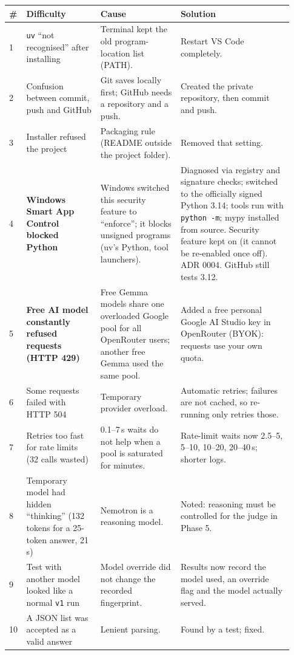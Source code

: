 \documentclass[11pt,a4paper]{article}
\newcommand{\code}[1]{\nolinkurl{#1}}
\begin{document}
\begin{longtable}{@{}p{0.03\linewidth}p{0.25\linewidth}p{0.27\linewidth}p{0.38\linewidth}@{}}
\toprule
\textbf{\#} & \textbf{Difficulty} & \textbf{Cause} & \textbf{Solution} \\
\midrule
\endhead
1 & \code{uv} ``not recognised'' after installing & Terminal kept the old program-location list (PATH). & Restart VS Code completely. \\
2 & Confusion between commit, push and GitHub & Git saves locally first; GitHub needs a repository and a push. & Created the private repository, then commit and push. \\
3 & Installer refused the project & Packaging rule (README outside the project folder). & Removed that setting. \\
4 & \textbf{Windows Smart App Control blocked Python} & Windows switched this security feature to ``enforce''; it blocks unsigned programs (uv's Python, tool launchers). & Diagnosed via registry and signature checks; switched to the officially signed Python 3.14; tools run with \texttt{python -m}; mypy installed from source. Security feature kept on (it cannot be re-enabled once off). ADR 0004. GitHub still tests 3.12. \\
5 & \textbf{Free AI model constantly refused requests (HTTP 429)} & Free Gemma models share one overloaded Google pool for all OpenRouter users; another free Gemma used the same pool. & Added a free personal Google AI Studio key in OpenRouter (BYOK): requests use your own quota. \\
6 & Some requests failed with HTTP 504 & Temporary provider overload. & Automatic retries; failures are not cached, so re-running only retries those. \\
7 & Retries too fast for rate limits (32 calls wasted) & 0.1--7\,s waits do not help when a pool is saturated for minutes. & Rate-limit waits now 2.5--5, 5--10, 10--20, 20--40\,s; shorter logs. \\
8 & Temporary model had hidden ``thinking'' (132 tokens for a 25-token answer, 21\,s) & Nemotron is a reasoning model. & Noted: reasoning must be controlled for the judge in Phase 5. \\
9 & Test with another model looked like a normal \code{v1} run & Model override did not change the recorded fingerprint. & Results now record the model used, an override flag and the model actually served. \\
10 & A JSON list was accepted as a valid answer & Lenient parsing. & Found by a test; fixed. \\

\end{longtable}
\end{document}
